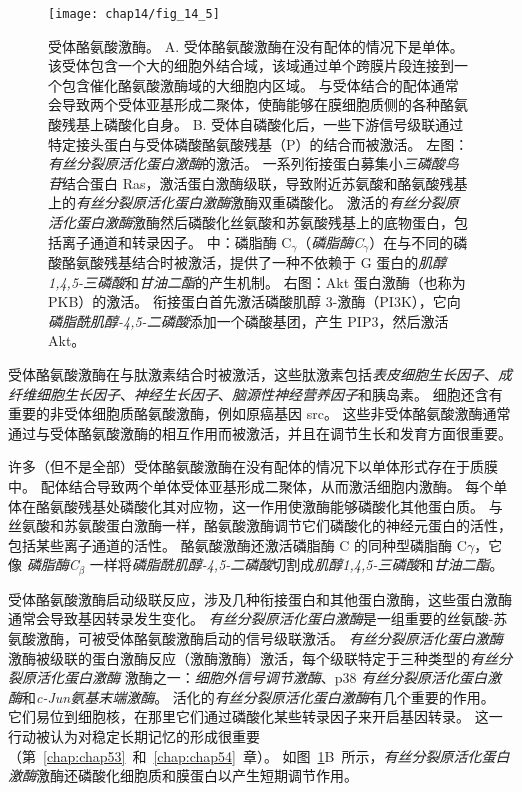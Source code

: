 \begin{figure}[htbp]
	\centering
	\texttt{[image: chap14/fig\_14\_5]}
	\caption{受体酪氨酸激酶。 
		A. 受体酪氨酸激酶在没有配体的情况下是单体。
		该受体包含一个大的细胞外结合域，该域通过单个跨膜片段连接到一个包含催化酪氨酸激酶域的大细胞内区域。
		与受体结合的配体通常会导致两个受体亚基形成二聚体，使酶能够在膜细胞质侧的各种酪氨酸残基上磷酸化自身。
		B. 受体自磷酸化后，一些下游信号级联通过特定接头蛋白与受体磷酸酪氨酸残基（P）的结合而被激活。
		左图：\textit{有丝分裂原活化蛋白激酶}的激活。
		一系列衔接蛋白募集小\textit{三磷酸鸟苷}结合蛋白 Ras，激活蛋白激酶级联，导致附近苏氨酸和酪氨酸残基上的\textit{有丝分裂原活化蛋白激酶}激酶双重磷酸化。
		激活的\textit{有丝分裂原活化蛋白激酶}激酶然后磷酸化丝氨酸和苏氨酸残基上的底物蛋白，包括离子通道和转录因子。
		中：磷脂酶 C$_{\gamma}$（\textit{磷脂酶C}$_{\gamma}$）在与不同的磷酸酪氨酸残基结合时被激活，提供了一种不依赖于 G 蛋白的\textit{肌醇1,4,5-三磷酸}和\textit{甘油二酯}的产生机制。
		右图：Akt 蛋白激酶（也称为 PKB）的激活。
		衔接蛋白首先激活磷酸肌醇 3-激酶（PI3K），它向\textit{磷脂酰肌醇-4,5-二磷酸}添加一个磷酸基团，产生 PIP3，然后激活 Akt。}
	\label{fig:14_5}
\end{figure}


受体酪氨酸激酶在与肽激素结合时被激活，这些肽激素包括\textit{表皮细胞生长因子}、\textit{成纤维细胞生长因子}、\textit{神经生长因子}、\textit{脑源性神经营养因子}和胰岛素。
细胞还含有重要的非受体细胞质酪氨酸激酶，例如原癌基因 src。
这些非受体酪氨酸激酶通常通过与受体酪氨酸激酶的相互作用而被激活，并且在调节生长和发育方面很重要。


许多（但不是全部）受体酪氨酸激酶在没有配体的情况下以单体形式存在于质膜中。
配体结合导致两个单体受体亚基形成二聚体，从而激活细胞内激酶。
每个单体在酪氨酸残基处磷酸化其对应物，这一作用使激酶能够磷酸化其他蛋白质。
与丝氨酸和苏氨酸蛋白激酶一样，酪氨酸激酶调节它们磷酸化的神经元蛋白的活性，包括某些离子通道的活性。
酪氨酸激酶还激活磷脂酶 C 的同种型磷脂酶 C$\gamma$，它像 \textit{磷脂酶C}$_\beta$ 一样将\textit{磷脂酰肌醇-4,5-二磷酸}切割成\textit{肌醇1,4,5-三磷酸}和\textit{甘油二酯}。


受体酪氨酸激酶启动级联反应，涉及几种衔接蛋白和其他蛋白激酶，这些蛋白激酶通常会导致基因转录发生变化。
\textit{有丝分裂原活化蛋白激酶}是一组重要的丝氨酸-苏氨酸激酶，可被受体酪氨酸激酶启动的信号级联激活。
\textit{有丝分裂原活化蛋白激酶}激酶被级联的蛋白激酶反应（激酶激酶）激活，每个级联特定于三种类型的\textit{有丝分裂原活化蛋白激酶} 激酶之一：\textit{细胞外信号调节激酶}、p38 \textit{有丝分裂原活化蛋白激酶}和\textit{c-Jun氨基末端激酶}。
活化的\textit{有丝分裂原活化蛋白激酶}有几个重要的作用。
它们易位到细胞核，在那里它们通过磷酸化某些转录因子来开启基因转录。
这一行动被认为对稳定长期记忆的形成很重要（第~\ref{chap:chap53}~和~\ref{chap:chap54}~章）。
如图~\ref{fig:14_5}B~所示，\textit{有丝分裂原活化蛋白激酶}激酶还磷酸化细胞质和膜蛋白以产生短期调节作用。



